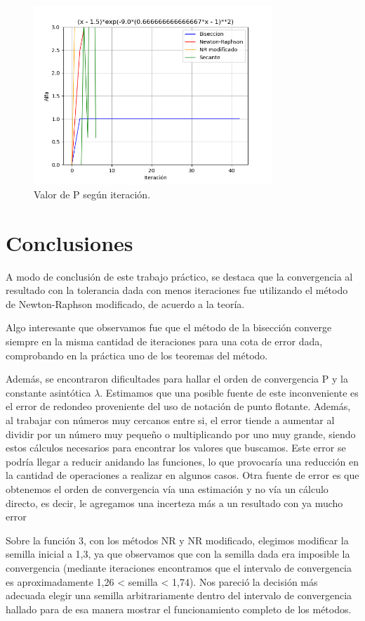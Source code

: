 \documentclass[titlepage,a4paper]{article}
\begin{document}
\begin{figure}[H]
    \centering
    \includegraphics[width=0.8\textwidth]{alfa f3.png}
    \caption{\label{fig:class01}Valor de P según iteración.}
\end{figure}


\newpage

\section{Conclusiones}\label{sec:conclusiones}

A modo de conclusión de este trabajo práctico, se destaca que la convergencia al resultado con la tolerancia dada con menos iteraciones fue utilizando el método de Newton-Raphson modificado, de acuerdo a la teoría. 

Algo interesante que observamos fue que el método de la bisección converge siempre en la misma cantidad de iteraciones para una cota de error dada, comprobando en la práctica uno de los teoremas del método.

Además, se encontraron dificultades para hallar el orden de convergencia P y la constante asintótica $\lambda$. Estimamos que una posible fuente de este inconveniente es el error de redondeo proveniente del uso de notación de punto flotante. Además, al trabajar con números muy cercanos entre si, el error tiende a aumentar al dividir por un número muy pequeño o multiplicando por uno muy grande, siendo estos cálculos necesarios para encontrar los valores que buscamos. Este error se podría llegar a reducir anidando las funciones, lo que provocaría una reducción en la cantidad de operaciones a realizar en algunos casos. 
Otra fuente de error es que obtenemos el orden de convergencia vía una estimación y no vía un cálculo directo, es decir, le agregamos una incerteza más a un resultado con ya mucho error
 
Sobre la función 3, con los métodos NR y NR modificado, elegimos modificar la semilla inicial a 1,3, ya que observamos que con la semilla dada era imposible la convergencia (mediante iteraciones encontramos que el intervalo de convergencia es aproximadamente 1,26 < semilla < 1,74). Nos pareció la decisión más adecuada elegir una semilla arbitrariamente dentro del intervalo de convergencia hallado para de esa manera mostrar el funcionamiento completo de los métodos.
\end{document}
